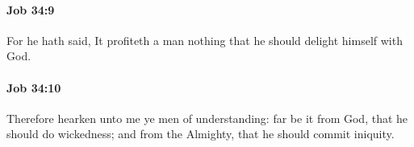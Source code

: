 		\paragraph{Job 34:9} %
			\label{JOB-34-9}

			For he hath said, It profiteth a man nothing that he should delight himself with God.


		\paragraph{Job 34:10} %
			\label{JOB-34-10}

			Therefore hearken unto me ye men of understanding: far be it from God, that he should do wickedness; and from the Almighty, that he should commit iniquity.


